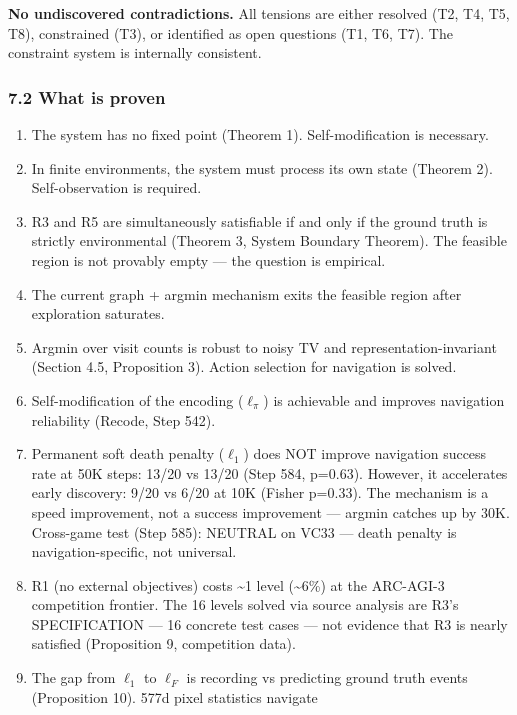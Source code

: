 \documentclass[
  11pt,
]{article}
\begin{document}
\textbf{No undiscovered contradictions.} All tensions are either
resolved (T2, T4, T5, T8), constrained (T3), or identified as open
questions (T1, T6, T7). The constraint system is internally consistent.

\subsubsection{7.2 What is proven}\label{what-is-proven}

\begin{enumerate}
\def\labelenumi{\arabic{enumi}.}
\item
  The system has no fixed point (Theorem 1). Self-modification is
  necessary.
\item
  In finite environments, the system must process its own state (Theorem
  2). Self-observation is required.
\item
  R3 and R5 are simultaneously satisfiable if and only if the ground
  truth is strictly environmental (Theorem 3, System Boundary Theorem).
  The feasible region is not provably empty --- the question is
  empirical.
\item
  The current graph + argmin mechanism exits the feasible region after
  exploration saturates.
\item
  Argmin over visit counts is robust to noisy TV and
  representation-invariant (Section 4.5, Proposition 3). Action
  selection for navigation is solved.
\item
  Self-modification of the encoding (\(\ell_\pi\)) is achievable and
  improves navigation reliability (Recode, Step 542).
\item
  Permanent soft death penalty (\(\ell_1\)) does NOT improve navigation
  success rate at 50K steps: 13/20 vs 13/20 (Step 584, p=0.63). However,
  it accelerates early discovery: 9/20 vs 6/20 at 10K (Fisher p=0.33).
  The mechanism is a speed improvement, not a success improvement ---
  argmin catches up by 30K. Cross-game test (Step 585): NEUTRAL on VC33
  --- death penalty is navigation-specific, not universal.
\item
  R1 (no external objectives) costs \textasciitilde1 level
  (\textasciitilde6\%) at the ARC-AGI-3 competition frontier. The 16
  levels solved via source analysis are R3's SPECIFICATION --- 16
  concrete test cases --- not evidence that R3 is nearly satisfied
  (Proposition 9, competition data).
\item
  The gap from \(\ell_1\) to \(\ell_F\) is recording vs predicting
  ground truth events (Proposition 10). 577d pixel statistics navigate

\end{enumerate}
\end{document}
